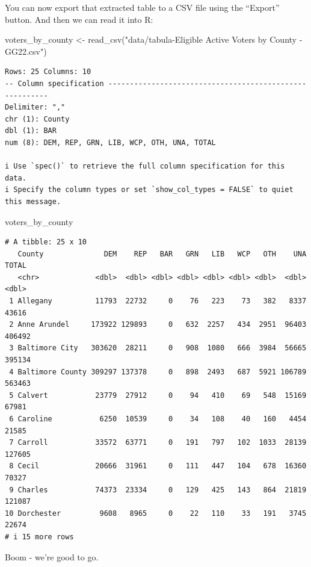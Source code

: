 \documentclass[
  letterpaper,
  DIV=11,
  numbers=noendperiod]{scrreprt}
\newenvironment{Shaded}{\begin{snugshade}}{\end{snugshade}}
\newcommand{\FunctionTok}[1]{\textcolor[rgb]{0.28,0.35,0.67}{#1}}
\newcommand{\NormalTok}[1]{\textcolor[rgb]{0.00,0.23,0.31}{#1}}
\newcommand{\OtherTok}[1]{\textcolor[rgb]{0.00,0.23,0.31}{#1}}
\newcommand{\StringTok}[1]{\textcolor[rgb]{0.13,0.47,0.30}{#1}}
\begin{document}
You can now export that extracted table to a CSV file using the
``Export'' button. And then we can read it into R:

\begin{Shaded}
\begin{Highlighting}[]
\NormalTok{voters\_by\_county }\OtherTok{\textless{}{-}} \FunctionTok{read\_csv}\NormalTok{(}\StringTok{"data/tabula{-}Eligible Active Voters by County {-} GG22.csv"}\NormalTok{)}
\end{Highlighting}
\end{Shaded}

\begin{verbatim}
Rows: 25 Columns: 10
-- Column specification --------------------------------------------------------
Delimiter: ","
chr (1): County
dbl (1): BAR
num (8): DEM, REP, GRN, LIB, WCP, OTH, UNA, TOTAL

i Use `spec()` to retrieve the full column specification for this data.
i Specify the column types or set `show_col_types = FALSE` to quiet this message.
\end{verbatim}

\begin{Shaded}
\begin{Highlighting}[]
\NormalTok{voters\_by\_county}
\end{Highlighting}
\end{Shaded}

\begin{verbatim}
# A tibble: 25 x 10
   County              DEM    REP   BAR   GRN   LIB   WCP   OTH    UNA  TOTAL
   <chr>             <dbl>  <dbl> <dbl> <dbl> <dbl> <dbl> <dbl>  <dbl>  <dbl>
 1 Allegany          11793  22732     0    76   223    73   382   8337  43616
 2 Anne Arundel     173922 129893     0   632  2257   434  2951  96403 406492
 3 Baltimore City   303620  28211     0   908  1080   666  3984  56665 395134
 4 Baltimore County 309297 137378     0   898  2493   687  5921 106789 563463
 5 Calvert           23779  27912     0    94   410    69   548  15169  67981
 6 Caroline           6250  10539     0    34   108    40   160   4454  21585
 7 Carroll           33572  63771     0   191   797   102  1033  28139 127605
 8 Cecil             20666  31961     0   111   447   104   678  16360  70327
 9 Charles           74373  23334     0   129   425   143   864  21819 121087
10 Dorchester         9608   8965     0    22   110    33   191   3745  22674
# i 15 more rows
\end{verbatim}

Boom - we're good to go.
\end{document}
